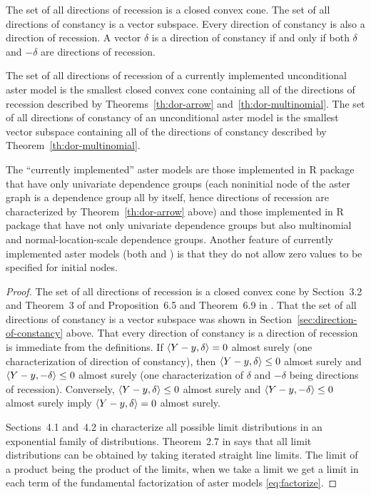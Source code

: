 \begin{theorem} \label{th:dor-aster}
The set of all directions of recession is a closed convex cone.
The set of all directions of constancy is a vector subspace.
Every direction of constancy is also a direction of recession.
A vector $\delta$ is a direction of constancy if and only if
both $\delta$ and $- \delta$ are directions of recession.

The set of all directions of recession of a currently implemented
unconditional aster model
is the smallest closed convex cone containing all of the directions
of recession described by Theorems~\ref{th:dor-arrow}
and~\ref{th:dor-multinomial}.
The set of all directions of constancy of an unconditional aster model
is the smallest vector subspace containing all of the directions
of constancy described by Theorem~\ref{th:dor-multinomial}.
\end{theorem}
The ``currently implemented'' aster models are those implemented
in R package  that have only univariate dependence groups
(each noninitial node of the aster graph is a dependence group all by
itself, hence directions of recession are characterized
by Theorem~\ref{th:dor-arrow} above) and those implemented
in R package  that have not only univariate dependence groups
but also multinomial and normal-location-scale dependence groups.
Another feature of currently implemented aster models (both 
and ) is that they do not allow zero values to be specified
for initial nodes.
\begin{proof}
The set of all directions of recession is a closed convex cone
by Section~3.2 and Theorem~3 of \citet{geyer-gdor} and Proposition~6.5
and Theorem~{6.9} in \citet{rockafellar-wets}.
That the set of all directions of constancy is a vector subspace
was shown in Section~\ref{sec:direction-of-constancy} above.
That every direction of constancy is a direction of recession is
immediate from the definitions.
If $\langle Y - y, \delta \rangle = 0$ almost surely (one characterization
of direction of constancy), then $\langle Y - y, \delta \rangle \le 0$ almost surely
and $\langle Y - y, - \delta \rangle \le 0$ almost surely (one characterization
of $\delta$ and $- \delta$ being directions of recession).
Conversely, $\langle Y - y, \delta \rangle \le 0$ almost surely
and $\langle Y - y, - \delta \rangle \le 0$ almost surely
imply $\langle Y - y, \delta \rangle = 0$ almost surely.

Sections~4.1 and~{4.2} in \citet{geyer-thesis} characterize all possible
limit distributions in an exponential family of distributions.
Theorem~{2.7} in \citet{geyer-thesis} says that all limit distributions
can be obtained by taking iterated straight line limits.
The limit of a product being the product of the limits, when we take a
limit we get a limit in each term of the fundamental factorization of
aster models \eqref{eq:factorize}.
\end{proof}


